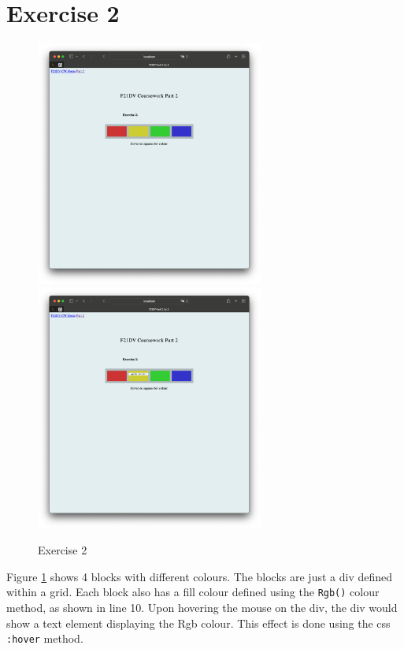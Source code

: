 \documentclass{scrreprt}
\begin{document}
\newpage
\section{Exercise 2}
\begin{figure}[!ht]
    \centering
    \includegraphics[width = 7.5cm]{images/ex2_1.png}
    \includegraphics[width = 7.5cm]{images/ex2_2.png}
    \label{fig:ex2}
    \caption{Exercise 2}
\end{figure}
\FloatBarrier
% 
Figure \ref{fig:ex2} shows 4 blocks with different colours. The blocks are just a div defined within a grid. Each block also has a fill colour defined using the \verb|Rgb()| colour method, as shown in line 10. Upon hovering the mouse on the div, the div would show a text element displaying the Rgb colour. This effect is done using the css \verb|:hover| method.

\newpage
\end{document}
